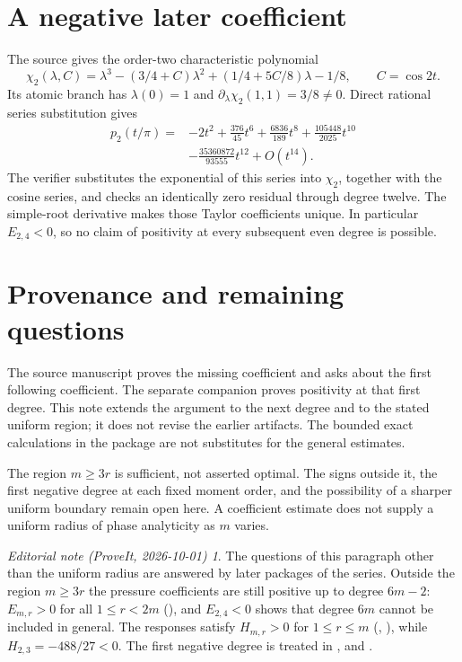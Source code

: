 \documentclass[11pt,a4paper]{article}
\theoremstyle{remark}\newtheorem*{ednote}{Editorial note (ProveIt, 2026-10-01)}
\begin{document}
\section{A negative later coefficient}\label{sec:negative}
The source gives the order-two characteristic polynomial
\[
 \chi_2(\lambda,C)=\lambda^3-(3/4+C)\lambda^2
                         +(1/4+5C/8)\lambda-1/8,
 \qquad C=\cos2t.
\]
Its atomic branch has $\lambda(0)=1$ and $\partial_\lambda\chi_2(1,1)=3/8\ne0$. Direct rational series substitution gives
\begin{align*}
 p_2(t/\pi)={}&-2t^2+\frac{376}{45}t^6
 +\frac{6836}{189}t^8+\frac{105448}{2025}t^{10}\\
 &-\frac{35360872}{93555}t^{12}+O(t^{14}).
\end{align*}
The verifier substitutes the exponential of this series into $\chi_2$, together with the cosine series, and checks an identically zero residual through degree twelve. The simple-root derivative makes those Taylor coefficients unique. In particular $E_{2,4}<0$, so no claim of positivity at every subsequent even degree is possible.

\section{Provenance and remaining questions}
The source manuscript \cite{integer} proves the missing coefficient and asks about the first following coefficient. The separate companion \cite{first} proves positivity at that first degree. This note extends the argument to the next degree and to the stated uniform region; it does not revise the earlier artifacts. The bounded exact calculations in the package are not substitutes for the general estimates.

The region $m\ge3r$ is sufficient, not asserted optimal. The signs outside it, the first negative degree at each fixed moment order, and the possibility of a sharper uniform boundary remain open here. A coefficient estimate does not supply a uniform radius of phase analyticity as $m$ varies.
\begin{ednote}
The questions of this paragraph other than the uniform radius are answered by later packages
of the series. Outside the region $m\ge3r$ the pressure coefficients are still positive up to
degree $6m-2$: $E_{m,r}>0$ for all $1\le r<2m$ (), and $E_{2,4}<0$
shows that degree $6m$ cannot be included in general. The responses satisfy $H_{m,r}>0$ for
$1\le r\le m$ (, ), while
$H_{2,3}=-488/27<0$. The first negative degree is treated in ,  and .
\end{ednote}
\end{document}
